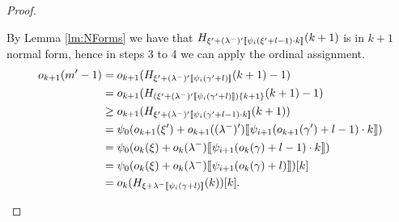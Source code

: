 \documentclass{amsart}
\theoremstyle{plain}
\theoremstyle{plain}
\def\scbrl{[\hspace{-.14em}[}
\def\scbrr{]\hspace{-.14em}]}
\def\scbr#1{\scbrl#1\scbrr}
\newcommand{\okpe}{o_{k+1}}
\newcommand{\ok}{o_{k}}
\newcommand{\ga}{\gamma}
\newcommand{\la}{\lambda}
\def\scbrl{[\hspace{-.14em}[}
\def\scbrr{]\hspace{-.14em}]}
\def\scbr#1{\scbrl#1\scbrr}
\begin{document}
\begin{proof}
\begin{Cases}
\begin{Cases}
\begin{Cases}
            By Lemma \ref{lm:NForms} we have that
            $H_{\xi'+(\la^-)'\scbr{\psi_i(\xi'+l-1)\cdot k}}(k+1)$ is in $k+1$ normal form, hence in steps 3 to 4 we can apply the ordinal assignment.
            \begin{align*} 
                \okpe(m'-1) & =\okpe(H_{\xi'+(\la^-)'\scbr{\psi_i(\ga'+l)}}(k+1) -1)\\
                & = \okpe(H_{(\xi'+(\la^-)'\scbr{\psi_i(\ga'+l)})\{k+1\}}(k+1) -1)\\
                & \geq  \okpe(H_{\xi'+(\la^-)'\scbr{\psi_i(\ga'+l-1)\cdot k}}(k+1))\\
                & =  \psi_0(\okpe(\xi')+ \okpe((\la^-)')\scbr{\psi_{i+1}(\okpe(\ga') + l-1)\cdot k})\\
                & = \psi_0( \ok(\xi)+ \ok(\la^-)\scbr{\psi_{i+1}(\ok(\ga) +l-1) \cdot k})\\
                & = \psi_0( \ok(\xi)+ \ok(\la^-)\scbr{\psi_{i+1}(\ok(\ga) +l)} )[k]\\
                &=\ok(H_{\xi+\la^-\scbr{\psi_i(\ga+l)}}(k))[k].\\
            \end{align*}		
            

\end{Cases}
\end{Cases}
\end{Cases}
\end{proof}
\end{document}
